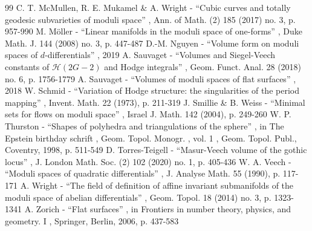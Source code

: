 \documentclass[11pt]{article}
\numberwithin{equation}{section}
\begin{document}
\begin{thebibliography}{99}
 C. T. McMullen, R. E. Mukamel \& A. Wright - “Cubic curves and totally geodesic subvarieties of moduli space” , Ann. of Math. (2) 185 (2017) no. 3, p. 957-990
 M. Möller - “Linear manifolds in the moduli space of one-forms” , Duke Math. J. 144 (2008) no. 3, p. 447-487
 D.-M. Nguyen - “Volume form on moduli spaces of $d$-differentials” , 2019
 A. Sauvaget - “Volumes and Siegel-Veech constants of $\mathcal{H}(2G-2)$ and Hodge integrals” , Geom. Funct. Anal. 28 (2018) no. 6, p. 1756-1779
 A. Sauvaget - “Volumes of moduli spaces of flat surfaces” , 2018
 W. Schmid - “Variation of Hodge structure: the singularities of the period mapping” , Invent. Math. 22 (1973), p. 211-319
 J. Smillie \& B. Weiss - “Minimal sets for flows on moduli space” , Israel J. Math. 142 (2004), p. 249-260
 W. P. Thurston - “Shapes of polyhedra and triangulations of the sphere” , in The Epstein birthday schrift , Geom. Topol. Monogr. , vol. 1 , Geom. Topol. Publ., Coventry, 1998, p. 511-549
 D. Torres-Teigell - “Masur-Veech volume of the gothic locus” , J. London Math. Soc. (2) 102 (2020) no. 1, p. 405-436
 W. A. Veech - “Moduli spaces of quadratic differentials” , J. Analyse Math. 55 (1990), p. 117-171
 A. Wright - “The field of definition of affine invariant submanifolds of the moduli space of abelian differentials” , Geom. Topol. 18 (2014) no. 3, p. 1323-1341
 A. Zorich - “Flat surfaces” , in Frontiers in number theory, physics, and geometry. I , Springer, Berlin, 2006, p. 437-583
\end{thebibliography}
\end{document}
